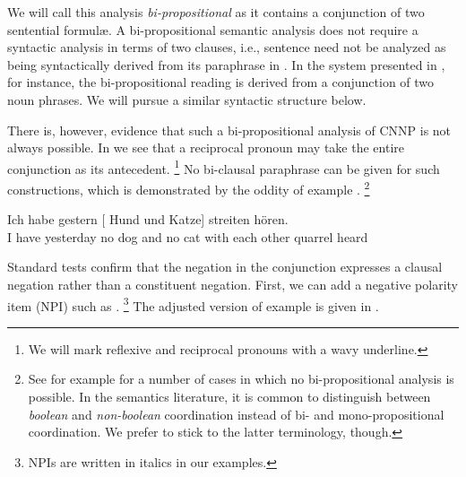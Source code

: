 \documentclass[output=paper]{langsci/langscibook}
\begin{document}
We will call this analysis \emph{bi-propositional} as it contains a conjunction of two sentential formul\ae. 
A bi-propositional semantic analysis does not require a syntactic analysis in terms of two clauses, i.e., sentence  need not be analyzed as being syntactically derived from its paraphrase in .
In the system presented in \citet{Keenan:Faltz:85}, for instance, the  bi-propositional reading is derived from a conjunction of two noun phrases.
We will pursue a similar syntactic structure below.


There is, however, evidence that such a bi-propositional analysis of CNNP is not always possible. 
In  we see that a reciprocal pronoun may take the entire conjunction as its antecedent.%
\footnote{We will mark reflexive and reciprocal pronouns with a wavy underline.}
No bi-clausal paraphrase can be given for such constructions, which is demonstrated by the oddity of example .%
\footnote{See for example \citet{Winter:01} for a number of cases in which no bi-propositional analysis is possible. In the semantics literature, it is common to distinguish between \emph{boolean} and \emph{non-boolean} coordination instead of bi- and mono-propositional coordination. We prefer to stick to the latter terminology, though.}

\ea \label{ex-refl}
\gll Ich habe gestern [ Hund und  Katze]  streiten hören.\\
I have yesterday \hphantom{[}no dog and no cat {with each other} quarrel heard\\
\glt {}
\z 

\z 

Standard tests confirm that the negation in the conjunction expresses a clausal negation rather than a constituent negation. First, we can add a negative polarity item (NPI) such as .%
\footnote{NPIs are written in italics in our examples.}
The adjusted version of example  is given in .
\end{document}
